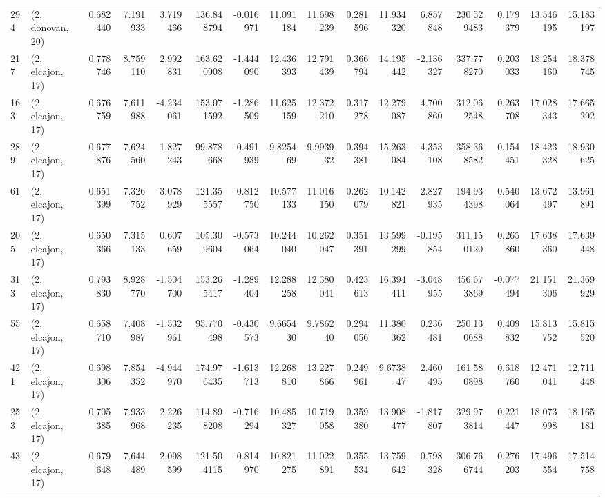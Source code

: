 \begin{tabular}{llrrrrrrrrrrrrrr}
294 &  (2, donovan, 20) &   0.682440 &   7.191933 &   3.719466 &   136.848794 &  -0.016971 &  11.091184 &  11.698239 &  0.281596 &  11.934320 &   6.857848 &   230.529483 &   0.179379 &  13.546195 &  15.183197 \\
217 &  (2, elcajon, 17) &   0.778746 &   8.759110 &   2.992831 &   163.620908 &  -1.444090 &  12.436393 &  12.791439 &  0.366794 &  14.195442 &  -2.136327 &   337.778270 &   0.203033 &  18.254160 &  18.378745 \\
163 &  (2, elcajon, 17) &   0.676759 &   7.611988 &  -4.234061 &   153.071592 &  -1.286509 &  11.625159 &  12.372210 &  0.317278 &  12.279087 &   4.700860 &   312.062548 &   0.263708 &  17.028343 &  17.665292 \\
289 &  (2, elcajon, 17) &   0.677876 &   7.624560 &   1.827243 &    99.878668 &  -0.491939 &   9.825469 &   9.993932 &  0.394381 &  15.263084 &  -4.353108 &   358.368582 &   0.154451 &  18.423328 &  18.930625 \\
61  &  (2, elcajon, 17) &   0.651399 &   7.326752 &  -3.078929 &   121.355557 &  -0.812750 &  10.577133 &  11.016150 &  0.262079 &  10.142821 &   2.827935 &   194.934398 &   0.540064 &  13.672497 &  13.961891 \\
205 &  (2, elcajon, 17) &   0.650366 &   7.315133 &   0.607659 &   105.309604 &  -0.573064 &  10.244040 &  10.262047 &  0.351391 &  13.599299 &  -0.195854 &   311.150120 &   0.265860 &  17.638360 &  17.639448 \\
313 &  (2, elcajon, 17) &   0.793830 &   8.928770 &  -1.504700 &   153.265417 &  -1.289404 &  12.288258 &  12.380041 &  0.423613 &  16.394411 &  -3.048955 &   456.673869 &  -0.077494 &  21.151306 &  21.369929 \\
55  &  (2, elcajon, 17) &   0.658710 &   7.408987 &  -1.532961 &    95.770498 &  -0.430573 &   9.665430 &   9.786240 &  0.294056 &  11.380362 &   0.236481 &   250.130688 &   0.409832 &  15.813752 &  15.815520 \\
421 &  (2, elcajon, 17) &   0.698306 &   7.854352 &  -4.944970 &   174.976435 &  -1.613713 &  12.268810 &  13.227866 &  0.249961 &   9.673847 &   2.460495 &   161.580898 &   0.618760 &  12.471041 &  12.711448 \\
253 &  (2, elcajon, 17) &   0.705385 &   7.933968 &   2.226235 &   114.898208 &  -0.716294 &  10.485327 &  10.719058 &  0.359380 &  13.908477 &  -1.817807 &   329.973814 &   0.221447 &  18.073998 &  18.165181 \\
43  &  (2, elcajon, 17) &   0.679648 &   7.644489 &   2.098599 &   121.504115 &  -0.814970 &  10.821275 &  11.022891 &  0.355534 &  13.759642 &  -0.798328 &   306.766744 &   0.276203 &  17.496554 &  17.514758 \\

\end{tabular}
